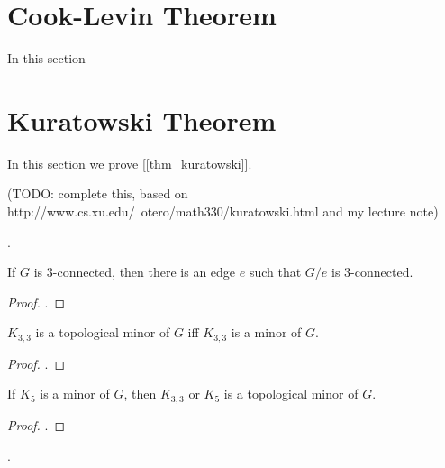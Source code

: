 

    \section{Cook-Levin Theorem}
        In this section
    
    \section{Kuratowski Theorem}
        In this section we prove [\ref{thm_kuratowski}].
        
        (TODO: complete this, based on http://www.cs.xu.edu/~otero/math330/kuratowski.html and my lecture note)
        
        \begin{defn}[Connectivity] \label{def_connectivity}
            .
        \end{defn}
        
        \begin{thm} \label{thm_3conn}
            If $G$ is 3-connected, then there is an edge $e$ such that $G/e$ is 3-connected.
        \end{thm}
        
        \begin{proof}
            .
        \end{proof}
        
        \begin{lemma} \label{lem_minor}
            $K_{3,3}$ is a topological minor of $G$ iff $K_{3,3}$ is a minor of $G$.
        \end{lemma}
        
        \begin{proof}
            .
        \end{proof}
        
        \begin{lemma} \label{lem_minor2}
            If $K_5$ is a minor of $G$, then $K_{3,3}$ or $K_5$ is a topological minor of $G$.
        \end{lemma}
        
        \begin{proof}
            .
        \end{proof}
        
        \begin{defn} \label{def_convex_embed}
            .
        \end{defn}
        
